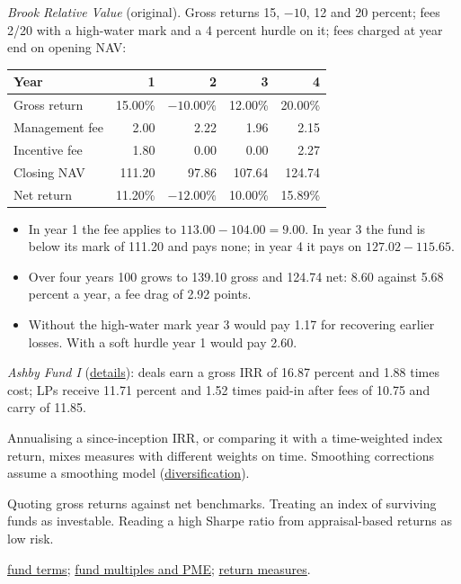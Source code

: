 \begin{qfmethod}
 \emph{Brook Relative Value} (original). Gross returns 15, $-10$, 12 and 20 percent; fees 2/20 with a high-water mark and a 4 percent hurdle on it; fees charged at year end on opening NAV:
\begin{center}\small
\begin{tabular}{@{}lrrrr@{}}
\toprule
Year & 1 & 2 & 3 & 4 \\
\midrule
Gross return & 15.00\% & $-10.00\%$ & 12.00\% & 20.00\% \\
Management fee & 2.00 & 2.22 & 1.96 & 2.15 \\
Incentive fee & 1.80 & 0.00 & 0.00 & 2.27 \\
Closing NAV & 111.20 & 97.86 & 107.64 & 124.74 \\
Net return & 11.20\% & $-12.00\%$ & 10.00\% & 15.89\% \\
\bottomrule
\end{tabular}
\end{center}
\begin{itemize}
\item In year 1 the fee applies to $113.00-104.00=9.00$. In year 3 the fund is below its mark of 111.20 and pays none; in year 4 it pays on $127.02-115.65$.
\item Over four years 100 grows to 139.10 gross and 124.74 net: 8.60 against 5.68 percent a year, a fee drag of 2.92 points.
\item Without the high-water mark year 3 would pay 1.17 for recovering earlier losses. With a soft hurdle year 1 would pay 2.60.
\end{itemize}
\emph{Ashby Fund I} (\hyperref[meth:gp-alignment-net-returns]{details}): deals earn a gross IRR of 16.87 percent and 1.88 times cost; LPs receive 11.71 percent and 1.52 times paid-in after fees of 10.75 and carry of 11.85.

 Annualising a since-inception IRR, or comparing it with a time-weighted index return, mixes measures with different weights on time. Smoothing corrections assume a smoothing model (\hyperref[meth:private-capital-diversification]{diversification}).

 Quoting gross returns against net benchmarks. Treating an index of surviving funds as investable. Reading a high Sharpe ratio from appraisal-based returns as low risk.

 \hyperref[def:alternative-fund-terms]{fund terms}; \hyperref[meth:private-fund-multiples-pme]{fund multiples and PME}; \hyperref[def:return-measures]{return measures}.

\end{qfmethod}

